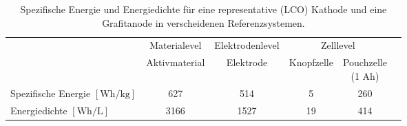 \begin{table}[ht]
    \centering
    \caption{\label{tab:energy_densities}Spezifische Energie und Energiedichte für eine representative  (LCO) Kathode und eine Grafitanode in verscheidenen Referenzsystemen.\cite{Son2021}}
    \begin{tabular}[t]{lccccc}
    \toprule
    \multirow{2}{*}{}
    &\multirow{1}{*}{Materialevel} %
    &\multirow{1}{*}{Elektrodenlevel}
    &\multicolumn{2}{c}{Zelllevel}
    \\ \cmidrule{2-5}
    &Aktivmaterial
    &Elektrode
    &Knopfzelle
    &\makecell{Pouchzelle\\(1 Ah)}
    \\
    \midrule
    \makecell{Spezifische Energie\\ $\left[ \si{\watt \hour \per \kg} \right]$} & 627 & 514 & 5 & 260\\
    \makecell{Energiedichte\\ $\left[ \si{\watt \hour \per \liter} \right]$} & 3166 & 1527 & 19 & 414\\
    \bottomrule
    \end{tabular}
\end{table}%